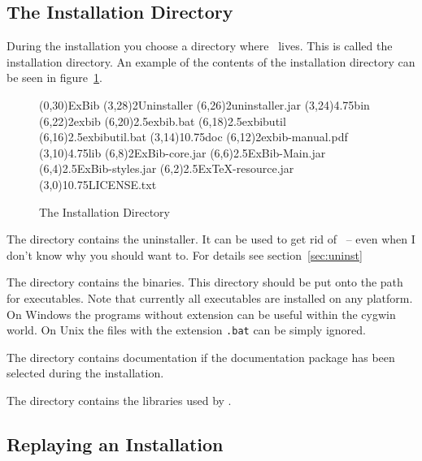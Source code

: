 \subsection{The Installation Directory}\label{sec:inst.dir}

During the installation you choose a directory where \ExBib\ lives.
This is called the installation directory. An example of the contents of the
installation directory can be seen in figure~\ref{fig:inst.dir}.

\begin{figure}[!ht]
  \centering
\begin{DirList}{200pt}{250pt}
  \TOPDIR(0,30){ExBib}
  \DIR(3,28)2{Uninstaller}
  \FILE(6,26)2{uninstaller.jar}
  \DIR(3,24){4.75}{bin}
  \FILE(6,22)2{exbib}
  \FILE(6,20){2.5}{exbib.bat}
  \FILE(6,18){2.5}{exbibutil}
  \FILE(6,16){2.5}{exbibutil.bat}
  \DIR(3,14){10.75}{doc}
  \FILE(6,12)2{exbib-manual.pdf}
  \DIR(3,10){4.75}{lib}
  \FILE(6,8){2}{ExBib-core.jar}
  \FILE(6,6){2.5}{ExBib-Main.jar}
  \FILE(6,4){2.5}{ExBib-styles.jar}
  \FILE(6,2){2.5}{ExTeX-resource.jar}
  \FILE(3,0){10.75}{LICENSE.txt}
\end{DirList}
  \caption{The Installation Directory}

  \label{fig:inst.dir}
\end{figure}

The directory  contains the uninstaller. It can be
used to get rid of \ExBib\ -- even when I don't know why you should
want to. For details see section~\ref{sec:uninst}

The directory  contains the binaries. This directory should
be put onto the path for executables. Note that currently all
executables are installed on any platform. On Windows the programs
without extension can be useful within the cygwin world. On Unix the
files with the extension \verb|.bat| can be simply ignored.

The directory  contains documentation if the documentation
package has been selected during the installation.

The directory  contains the libraries used by \ExBib.


\subsection{Replaying an Installation}\label{sec:replay}

